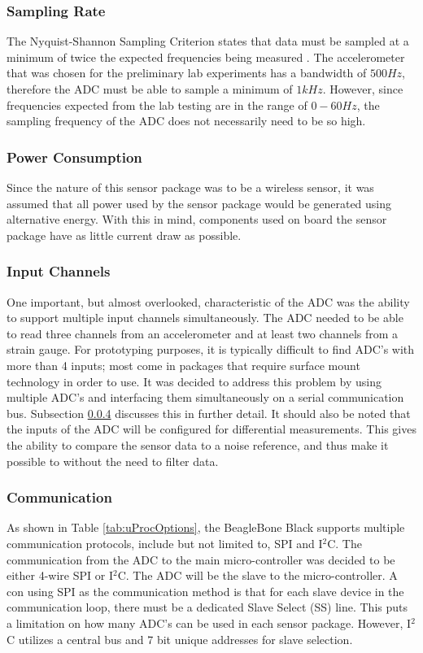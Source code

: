 \subsubsection{Sampling Rate}		%
\label{sec:adc_fin}
\indent The Nyquist-Shannon Sampling Criterion states that data must be sampled at a minimum of twice the expected frequencies being measured \cite{MusaJouaneh:2013}. The accelerometer that was chosen for the preliminary lab experiments has a bandwidth of $500 Hz$, therefore the ADC must be able to sample a minimum of $1kHz$. However, since frequencies expected from the lab testing are in the range of $0-60Hz$, the sampling frequency of the ADC does not necessarily need to be so high. %
%
\subsubsection{Power Consumption}
\label{sec:adc_power_cons.}
\indent Since the nature of this sensor package was to be a wireless sensor, it was assumed that all power used by the sensor package would be generated using alternative energy. With this in mind, components used on board the sensor package have as little current draw as possible.
%
\subsubsection{Input Channels}
\label{sec:adc_in_ch_num}
\indent One important, but almost overlooked, characteristic of the ADC was the ability to support multiple input channels simultaneously. The ADC needed to be able to read three channels from an accelerometer and at least two channels from a strain gauge. For prototyping purposes, it is typically difficult to find ADC's with more than 4 inputs; most come in packages that require surface mount technology in order to use. It was decided to address this problem by using multiple ADC's and interfacing them simultaneously on a serial communication bus. Subsection \ref{sec:adc_comm} discusses this in further detail. It should also be noted that the inputs of the ADC will be configured for differential measurements. This gives the ability to compare the sensor data to a noise reference, and thus make it possible to without the need to filter data. %
%
\subsubsection{Communication}
\label{sec:adc_comm}
\indent As shown in Table \ref{tab:uProcOptions}, the BeagleBone Black supports multiple communication protocols, include but not limited to, SPI and I$^{2}$C. The communication from the ADC to the main micro-controller was decided to be either  4-wire SPI or I$^{2}$C. The ADC will be the slave to the micro-controller. A con using SPI as the communication method is that for each slave device in the communication loop, there must be a dedicated Slave Select (SS) line. This puts a limitation on how many ADC's can be used in each sensor package. However, I$^{2}$C utilizes a central bus and 7 bit unique addresses for slave selection.


